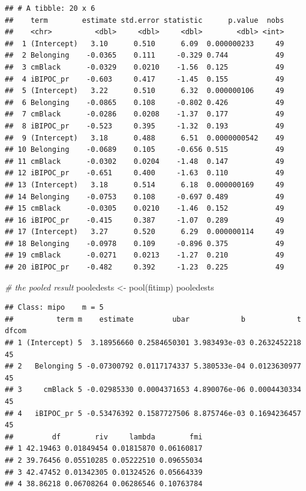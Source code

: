 \documentclass[
]{book}
\newenvironment{Shaded}{\begin{snugshade}}{\end{snugshade}}
\newcommand{\CommentTok}[1]{\textcolor[rgb]{0.56,0.35,0.01}{\textit{#1}}}
\newcommand{\FunctionTok}[1]{\textcolor[rgb]{0.00,0.00,0.00}{#1}}
\newcommand{\NormalTok}[1]{#1}
\newcommand{\OtherTok}[1]{\textcolor[rgb]{0.56,0.35,0.01}{#1}}
\begin{document}
\begin{verbatim}
## # A tibble: 20 x 6
##    term        estimate std.error statistic      p.value  nobs
##    <chr>          <dbl>     <dbl>     <dbl>        <dbl> <int>
##  1 (Intercept)   3.10      0.510      6.09  0.000000233     49
##  2 Belonging    -0.0365    0.111     -0.329 0.744           49
##  3 cmBlack      -0.0329    0.0210    -1.56  0.125           49
##  4 iBIPOC_pr    -0.603     0.417     -1.45  0.155           49
##  5 (Intercept)   3.22      0.510      6.32  0.000000106     49
##  6 Belonging    -0.0865    0.108     -0.802 0.426           49
##  7 cmBlack      -0.0286    0.0208    -1.37  0.177           49
##  8 iBIPOC_pr    -0.523     0.395     -1.32  0.193           49
##  9 (Intercept)   3.18      0.488      6.51  0.0000000542    49
## 10 Belonging    -0.0689    0.105     -0.656 0.515           49
## 11 cmBlack      -0.0302    0.0204    -1.48  0.147           49
## 12 iBIPOC_pr    -0.651     0.400     -1.63  0.110           49
## 13 (Intercept)   3.18      0.514      6.18  0.000000169     49
## 14 Belonging    -0.0753    0.108     -0.697 0.489           49
## 15 cmBlack      -0.0305    0.0210    -1.46  0.152           49
## 16 iBIPOC_pr    -0.415     0.387     -1.07  0.289           49
## 17 (Intercept)   3.27      0.520      6.29  0.000000114     49
## 18 Belonging    -0.0978    0.109     -0.896 0.375           49
## 19 cmBlack      -0.0271    0.0213    -1.27  0.210           49
## 20 iBIPOC_pr    -0.482     0.392     -1.23  0.225           49
\end{verbatim}

\begin{Shaded}
\begin{Highlighting}[]
\CommentTok{\# the pooled result}
\NormalTok{pooledests }\OtherTok{\textless{}{-}} \FunctionTok{pool}\NormalTok{(fitimp)}
\NormalTok{pooledests}
\end{Highlighting}
\end{Shaded}

\begin{verbatim}
## Class: mipo    m = 5 
##          term m    estimate         ubar            b            t dfcom
## 1 (Intercept) 5  3.18956660 0.2584650301 3.983493e-03 0.2632452218    45
## 2   Belonging 5 -0.07300792 0.0117174337 5.380533e-04 0.0123630977    45
## 3     cmBlack 5 -0.02985330 0.0004371653 4.890076e-06 0.0004430334    45
## 4   iBIPOC_pr 5 -0.53476392 0.1587727506 8.875746e-03 0.1694236457    45
##         df        riv     lambda        fmi
## 1 42.19463 0.01849454 0.01815870 0.06160817
## 2 39.76456 0.05510285 0.05222510 0.09655034
## 3 42.47452 0.01342305 0.01324526 0.05664339
## 4 38.86218 0.06708264 0.06286546 0.10763784
\end{verbatim}
\end{document}
